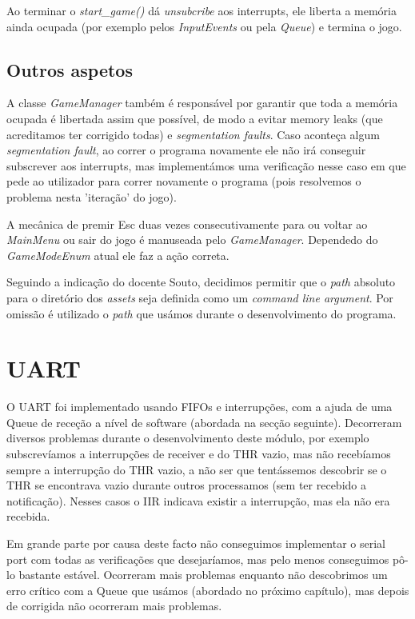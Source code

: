 \documentclass{report}
\begin{document}
Ao terminar o \textit{start\_game()} dá \textit{unsubcribe} aos interrupts, ele liberta a memória ainda ocupada (por exemplo pelos \textit{InputEvents} ou pela \textit{Queue}) e termina o jogo.

\subsection{Outros aspetos}

A classe \textit{GameManager} também é responsável por garantir que toda a memória ocupada é libertada assim que possível, de modo a evitar memory leaks (que acreditamos ter corrigido todas) e \textit{segmentation faults}. Caso aconteça algum \textit{segmentation fault}, ao correr o programa novamente ele não irá conseguir subscrever aos interrupts, mas implementámos uma verificação nesse caso em que pede ao utilizador para correr novamente o programa (pois resolvemos o problema nesta 'iteração' do jogo).

A mecânica de premir Esc duas vezes consecutivamente para ou voltar ao \textit{MainMenu} ou sair do jogo é manuseada pelo \textit{GameManager}. Dependedo do \textit{GameModeEnum} atual ele faz a ação correta.

Seguindo a indicação do docente Souto, decidimos permitir que o \textit{path} absoluto para o diretório dos \textit{assets} seja definida como um \textit{command line argument}. Por omissão é utilizado o \textit{path} que usámos durante o desenvolvimento do programa.

\section{UART}

O UART foi implementado usando FIFOs e interrupções, com a ajuda de uma Queue de receção a nível de software (abordada na secção seguinte). Decorreram diversos problemas durante o desenvolvimento deste módulo, por exemplo subscrevíamos a interrupções de receiver e do THR vazio, mas não recebíamos sempre a interrupção do THR vazio, a não ser que tentássemos descobrir se o THR se encontrava vazio durante outros processamos (sem ter recebido a notificação). Nesses casos o IIR indicava existir a interrupção, mas ela não era recebida.

Em grande parte por causa deste facto não conseguimos implementar o serial port com todas as verificações que desejaríamos, mas pelo menos conseguimos pô-lo bastante estável. Ocorreram mais problemas enquanto não descobrimos um erro crítico com a Queue que usámos (abordado no próximo capítulo), mas depois de corrigida não ocorreram mais problemas.
\end{document}

